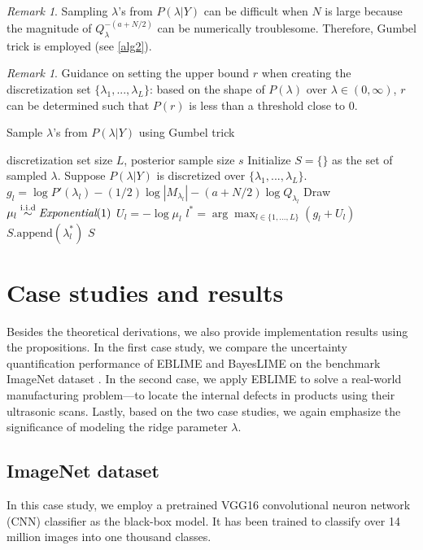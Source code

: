 \documentclass{article}
\theoremstyle{plain}
\theoremstyle{definition}
\theoremstyle{remark}
\newtheorem{remark}[theorem]{Remark}
\begin{document}
\begin{remark}\label{r2}  Sampling $\lambda$'s from $P(\lambda|Y)$ can be difficult when $N$ is large because the magnitude of $Q_{\lambda}^{-(a+N/2)}$ can be numerically troublesome. Therefore, Gumbel trick \cite{maddison2016} is employed (see \cref{alg2}).

\begin{remark}\label{r3} Guidance on setting the upper bound $r$ when creating the discretization set $\{\lambda_1,...,\lambda_L\}$: based on the shape of $P(\lambda)$ over $\lambda\in(0,\infty)$, $r$ can be determined such that $P(r)$ is less than a threshold close to 0. 
\end{remark}

\begin{algorithm}[htb]
   \caption{Sample $\lambda$'s from $P(\lambda|Y)$ using Gumbel trick}
   \label{alg2}
\begin{algorithmic}[1]
    discretization set size $L$, posterior sample size $s$
   \STATE Initialize $S = \{\}$ as the set of sampled $\lambda$.
   \STATE Suppose $P(\lambda|Y)$ is discretized over $\{\lambda_1,...,\lambda_L\}$.
   \STATE $g_l = \log{P'(\lambda_l)}-(1/2)\log{|M_{\lambda_l}|}-(a+N/2)\log{Q_{\lambda_l}}$
    \STATE Draw $\mu_l \overset{\mathrm{i.i.d}}{\sim} \textit{\textrm{Exponential}}(1)$
    \STATE $U_l = -\log{\mu_l}$
   \ENDFOR
   \STATE $l^* = \arg\max_{l\in\{1,...,L\}}(g_l+U_l)$
   \STATE $S.\mathrm{append}(\lambda_l^*)$
   \ENDFOR
    $S$
\end{algorithmic}
\end{algorithm}
\end{remark}

\section{Case studies and results}\label{case study}
Besides the theoretical derivations, we also provide implementation results using the propositions. In the first case study, we compare the uncertainty quantification performance of EBLIME and BayesLIME on the benchmark ImageNet dataset \cite{deng2009}. In the second case, we apply EBLIME to solve a real-world manufacturing problem---to locate the internal defects in products using their ultrasonic scans. Lastly, based on the two case studies, we again emphasize the significance of modeling the ridge parameter $\lambda$. 
\subsection{ImageNet dataset}
In this case study, we employ a pretrained VGG16 convolutional neuron network (CNN) classifier \cite{simonyan2014} as the black-box model. It has been trained to classify over 14 million images into one thousand classes.
\end{document}
